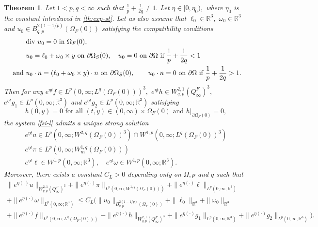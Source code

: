 \documentclass[12pt,a4paper,reqno]{amsart}
\newtheorem{theorem}{Theorem}[section]
\theoremstyle{definition}
\theoremstyle{remark}
\numberwithin{equation}{section}
\newcommand{\oso}{\Omega_{S}(0)}
\newcommand{\ofo}{\Omega_{F}(0)}
\newcommand{\rt}{\mathbb{R}^{3}}
\newcommand{\ds}{\displaystyle}
\newcommand{\poso}{\partial\oso}
\begin{document}
\begin{theorem} \label{lplq-L}
Let $1 < p,q < \infty$ such that $\ds \frac{1}{p} + \frac{1}{2q} \neq 1.$ Let $\eta \in [0,\eta_{0}),$ where $\eta_{0}$ is the constant introduced in \cref{th:exp-st}.
Let us also assume that  $\ell_{0} \in \rt,$ $\omega_{0} \in \rt$ and $u_{0} \in B^{2(1-1/p)}_{q,p}(\ofo)$ satisfying the compatibility conditions
\begin{align} \label{cc}
&\mathrm{div} \  u_{0} = 0 \mbox{ in } \ofo,  \notag \\
& u_{0} = \ell_{0} + \omega_{0} \times y \mbox{ on } \poso, \quad u_{0} = 0 \mbox{ on } \partial\Omega \mbox{ if } \frac{1}{p} + \frac{1}{2q} < 1  \\
\mbox{ and } & u_{0} \cdot n = (\ell_{0} + \omega_{0} \times y) \cdot n \mbox{ on } \poso, \quad \quad u_{0} \cdot n = 0 \mbox{ on } \partial \Omega \mbox{ if } \frac{1}{p} + \frac{1}{2q} > 1. \notag
\end{align}
Then for any $e^{\eta t} f \in L^{p}(0,\infty;L^{q}(\ofo))^{3},$ $e^{\eta t} h \in W^{2,1}_{q,p} (Q^{F}_{\infty})^{3},$ $e^{\eta t} g_{1} \in L^{p}(0,\infty;\rt)$ and $ e^{\eta t} g_{2} \in  L^{p}(0,\infty;\rt)$ satisfying
\[ h(0,y) = 0 \mbox{ for all } (t,y) \in (0,\infty) \times \ofo \mbox{ and } h|_{\partial\ofo} = 0,
\]the system \eqref{fsi-l} admits a unique strong solution
\begin{gather*}
e^{\eta t}u \in L^{p}(0,\infty;W^{2,q}(\ofo)^{3}) \cap W^{1,p}(0,\infty;L^{q}(\ofo)^{3}) \\
 e^{\eta t} \pi \in L^{p}(0,\infty;W^{1,q}_{m}(\ofo)) \\
 e^{\eta t} \ell  \in W^{1,p}(0,\infty;\rt), \quad e^{\eta t} \omega  \in W^{1,p}(0,\infty;\rt).
\end{gather*}
Moreover, there exists a constant $C_{L} > 0$ depending only on $\Omega, p$ and $q$ such that
\begin{multline} \label{est:L}
\|e^{\eta (\cdot)}u \|_{W^{2,1}_{q,p} (Q^{F}_{\infty})^{3}}
+ \|e^{\eta (\cdot)}\pi \|_{L^{p}(0,\infty;W^{1,q}(\ofo))}
+ \|e^{\eta (\cdot)}\ell \|_{L^{p}(0,\infty;\rt)} \\ + \|e^{\eta (\cdot)}\omega \|_{L^{p}(0,\infty;\rt)} \leqslant C_{L} \Big(\|u_{0}\|_{B^{2(1-1/p)}_{q,p}(\ofo)} + \|\ell_{0}\|_{\rt} + \|\omega_{0}\|_{\rt} \\
+ \|e^{\eta (\cdot)} f \|_{L^{p}(0,\infty;L^{q}(\ofo))} + \|e^{\eta (\cdot)} h\|_{W^{2,1}_{q,p} (Q^{F}_{\infty})^{3}} + \|e^{\eta (\cdot)} g_{1} \|_{L^{p}(0,\infty;\rt)} + \|e^{\eta (\cdot)} g_{2} \|_{L^{p}(0,\infty;\rt)}\Big).
\end{multline}
\end{theorem}
\end{document}
